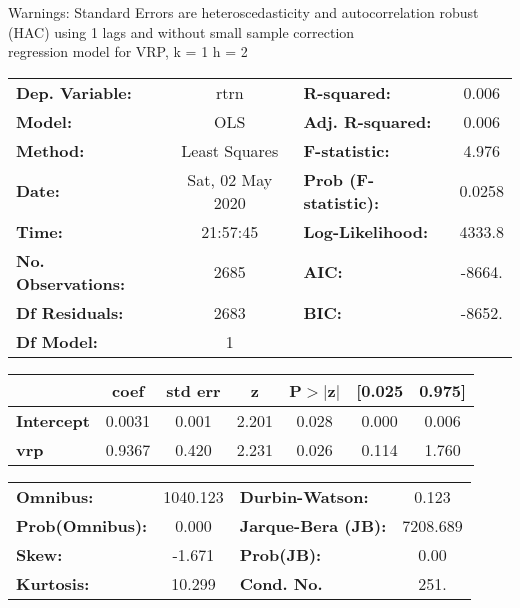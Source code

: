 Warnings: \newline
 [1] Standard Errors are heteroscedasticity and autocorrelation robust (HAC) using 1 lags and without small sample correction\\ 

regression model for VRP, k = 1 h = 2\begin{center}
\begin{tabular}{lclc}
\toprule
\textbf{Dep. Variable:}    &       rtrn       & \textbf{  R-squared:         } &     0.006   \\
\textbf{Model:}            &       OLS        & \textbf{  Adj. R-squared:    } &     0.006   \\
\textbf{Method:}           &  Least Squares   & \textbf{  F-statistic:       } &     4.976   \\
\textbf{Date:}             & Sat, 02 May 2020 & \textbf{  Prob (F-statistic):} &   0.0258    \\
\textbf{Time:}             &     21:57:45     & \textbf{  Log-Likelihood:    } &    4333.8   \\
\textbf{No. Observations:} &        2685      & \textbf{  AIC:               } &    -8664.   \\
\textbf{Df Residuals:}     &        2683      & \textbf{  BIC:               } &    -8652.   \\
\textbf{Df Model:}         &           1      & \textbf{                     } &             \\
\bottomrule
\end{tabular}
\begin{tabular}{lcccccc}
                   & \textbf{coef} & \textbf{std err} & \textbf{z} & \textbf{P$> |$z$|$} & \textbf{[0.025} & \textbf{0.975]}  \\
\midrule
\textbf{Intercept} &       0.0031  &        0.001     &     2.201  &         0.028        &        0.000    &        0.006     \\
\textbf{vrp}       &       0.9367  &        0.420     &     2.231  &         0.026        &        0.114    &        1.760     \\
\bottomrule
\end{tabular}
\begin{tabular}{lclc}
\textbf{Omnibus:}       & 1040.123 & \textbf{  Durbin-Watson:     } &    0.123  \\
\textbf{Prob(Omnibus):} &   0.000  & \textbf{  Jarque-Bera (JB):  } & 7208.689  \\
\textbf{Skew:}          &  -1.671  & \textbf{  Prob(JB):          } &     0.00  \\
\textbf{Kurtosis:}      &  10.299  & \textbf{  Cond. No.          } &     251.  \\
\bottomrule
\end{tabular}
\end{center}

